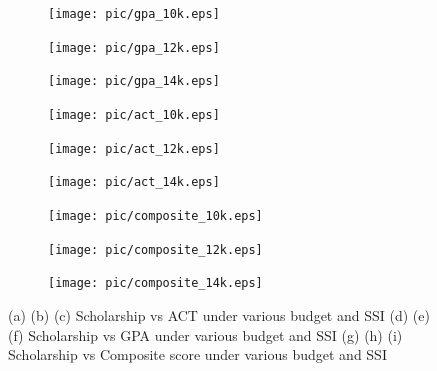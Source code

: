\documentclass[12pt,english]{report}
\begin{document}
\begin{figure}
\centering
\begin{subfigure}{0.33\textwidth}
\texttt{[image: pic/gpa\_10k.eps]}
\caption{} \label{allocation_results_a}
\end{subfigure}\hspace*{\fill}
\begin{subfigure}{0.33\textwidth }
\texttt{[image: pic/gpa\_12k.eps]}
\caption{} %
\end{subfigure}\hspace*{\fill}
\begin{subfigure}{0.33\textwidth}
\texttt{[image: pic/gpa\_14k.eps]}
\caption{} %
\end{subfigure}\hspace*{\fill}

\medskip

\begin{subfigure}{0.33\textwidth}
\texttt{[image: pic/act\_10k.eps]}
\caption{} %
\end{subfigure}\hspace*{\fill}
\begin{subfigure}{0.33\textwidth }
\texttt{[image: pic/act\_12k.eps]}
\caption{} %
\end{subfigure}\hspace*{\fill}
\begin{subfigure}{0.33\textwidth}
\texttt{[image: pic/act\_14k.eps]}
\caption{} %
\end{subfigure}\hspace*{\fill}

\medskip

\begin{subfigure}{0.33\textwidth} 
\texttt{[image: pic/composite\_10k.eps]}
\caption{} \label{allocation_results_g}
\end{subfigure}\hspace*{\fill}
\begin{subfigure}{0.33\textwidth }
\texttt{[image: pic/composite\_12k.eps]}
\caption{} %
\end{subfigure}\hspace*{\fill}
\begin{subfigure}{0.33\textwidth}
\texttt{[image: pic/composite\_14k.eps]}
\caption{} %
\end{subfigure}\hspace*{\fill}
  \caption{
    (a) (b) (c) Scholarship vs ACT under various budget and SSI
    (d) (e) (f) Scholarship vs GPA under various budget and SSI 
    (g) (h) (i) Scholarship vs Composite score under various budget and SSI}
  \label{allocation_results} 


\end{figure}
\end{document}

